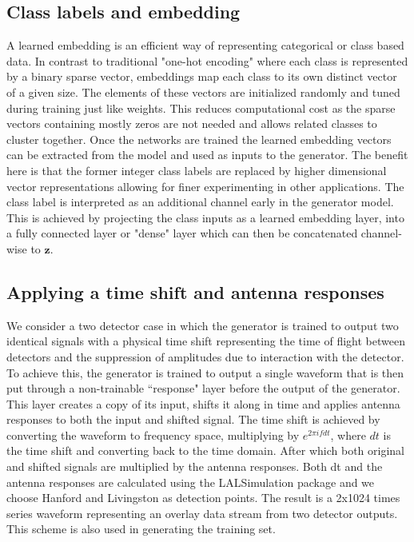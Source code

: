 \documentclass[12pt]{iopart}
\begin{document}
\subsection{Class labels and embedding}
A learned embedding is an efficient way of representing categorical or class based data. In contrast to traditional "one-hot encoding" where each class is represented by a binary sparse vector, embeddings map each class to its own distinct vector of a given size. The elements of these vectors are initialized randomly and tuned during training just like weights. This reduces computational cost as the sparse vectors containing mostly zeros are not needed and allows related classes to cluster together. Once the networks are trained the learned embedding vectors can be extracted from the model and used as inputs to the generator. The benefit here is that the former integer class labels are replaced by higher dimensional vector representations allowing for finer experimenting in other applications. The class label is interpreted as an additional channel early in the generator model. This is achieved by projecting the class inputs as a learned embedding layer, into a fully connected layer or "dense" layer which can then be concatenated channel-wise to $\textbf{z}$. 

\subsection{Applying a time shift and antenna responses}
We consider a two detector case in which the generator is trained to output two identical signals with a physical time shift representing the time of flight between detectors and the suppression of amplitudes due to interaction with the detector. To achieve this, the generator is trained to output a single waveform that is then put through a non-trainable ``response" layer before the output of the generator. This layer creates a copy of its input, shifts it along in time and applies antenna responses to both the input and shifted signal. The time shift is achieved by converting the waveform to frequency space, multiplying by $e^{2 \pi i f dt}$, where $dt$ is the time shift and converting back to the time domain. After which both original and shifted signals are multiplied by the antenna responses. Both dt and the antenna responses are calculated using the LALSimulation \cite{lalsuite} package and we choose Hanford and Livingston as detection points. The result is a 2x1024 times series waveform representing an overlay data stream from two detector outputs. This scheme is also used in generating the training set. 
\end{document}
